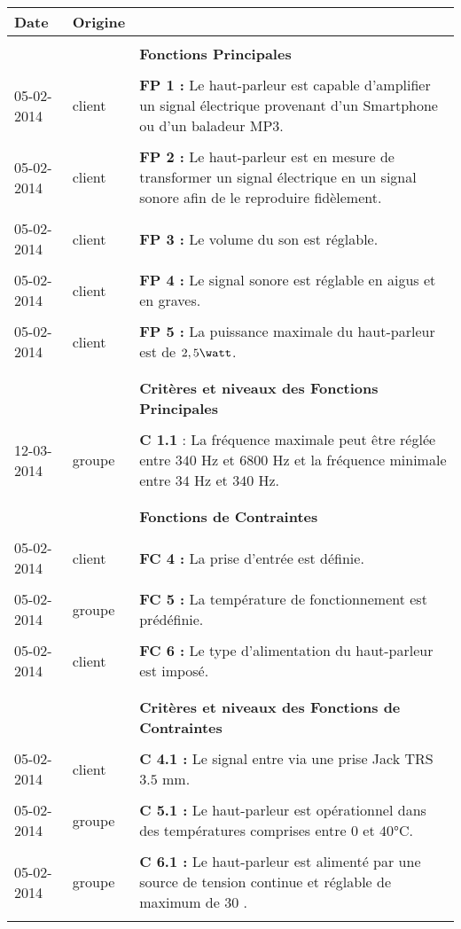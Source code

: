 \begin{tabular}{|p{2cm}|p{1.5cm}|p{13.2cm}|}
 		\textbf{Date} & \textbf{Origine} & \\
 \hline
 	& &\\
		& & \textbf{Fonctions Principales} \\
 	& &\\
		05-02-2014 & client & \textbf{FP 1 :} Le haut-parleur est capable d’amplifier un signal électrique provenant d’un Smartphone ou d’un baladeur MP3.\\
	& &\\
		05-02-2014 & client & \textbf{FP 2 :} Le haut-parleur est en mesure de transformer un signal électrique en un signal sonore afin de le reproduire fidèlement.  \\
	& &\\
		05-02-2014 & client & \textbf{FP 3 :} Le volume du son est réglable.\\
	& &\\
		05-02-2014 & client & \textbf{FP 4 :} Le signal sonore est réglable en aigus et en graves.\\
	& &\\
		05-02-2014 & client & \textbf{FP 5 :} La puissance maximale du haut-parleur est de $2,5  \watt$.\\
	& &\\
\hline
	 & &\\
	 	& & \textbf{Critères et niveaux des Fonctions Principales} \\
	 & &\\
	 	12-03-2014 & groupe & \textbf{C 1.1} : La fréquence maximale peut être réglée entre $340$ Hz et $6800$ Hz et la fréquence minimale entre $34$ Hz et $340$ Hz.\\
	 & &\\
\hline
	 & &\\
	 & & \textbf{ Fonctions de Contraintes}\\
	 & &\\
		05-02-2014 & client & \textbf{FC 4 :} La prise d’entrée est définie.\\
	 & &\\
		05-02-2014 & groupe & \textbf{FC 5 :} La température de fonctionnement est prédéfinie.\\
	 & &\\
		05-02-2014 & client & \textbf{FC 6 :} Le type d’alimentation du haut-parleur est imposé.\\
	 & &\\
\hline
	& &\\
		& & \textbf{ Critères et niveaux des Fonctions de Contraintes}\\
	& &\\
	 	05-02-2014 & client & \textbf{C 4.1 :} Le signal entre via une prise Jack TRS $3.5$ mm.\\
	& &\\
		05-02-2014 & groupe & \textbf{C 5.1 :} Le haut-parleur est opérationnel dans des températures comprises entre $0$ et $40$°C.\\
	& &\\
		05-02-2014 & groupe & \textbf{C 6.1 :} Le haut-parleur est alimenté par une source de tension continue et réglable de maximum de $30$ \volt.\\
	 & &\\
\hline
 \end{tabular}
